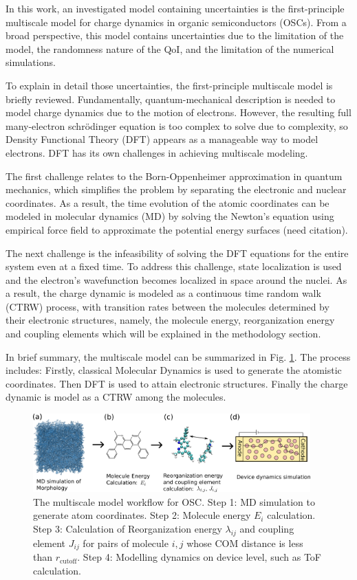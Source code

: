 \documentclass[letterpaper,12pt]{article}
\begin{document}
In this work, an investigated model containing uncertainties is the first-principle multiscale model for charge dynamics in organic semiconductors (OSCs).
From a broad perspective, this model contains uncertainties due to the limitation of the model, the randomness nature of the QoI, and the limitation of the numerical simulations.

To explain in detail those uncertainties, the first-principle multiscale model is briefly reviewed. 
Fundamentally, quantum-mechanical description is needed to model charge dynamics due to the motion of electrons. However, the resulting full many-electron schr\"{o}dinger equation is too complex to solve due to complexity, so Density Functional Theory (DFT) appears as a manageable way to model electrons.
DFT has its own challenges in achieving multiscale modeling.

The first challenge relates to the Born-Oppenheimer approximation in quantum
mechanics, which simplifies the problem by separating the electronic and nuclear
coordinates. As a result, the time evolution of the atomic coordinates can be modeled in molecular dynamics (MD) by solving the Newton's equation using empirical force field to approximate the potential energy surfaces (need citation). 

The next challenge is the infeasibility of solving the DFT equations for the entire system even at a fixed time. To address this challenge, state localization is used and the electron's wavefunction becomes localized in space around the nuclei. As a result, the charge dynamic is modeled as a continuous time random walk (CTRW) process, with transition rates between the molecules determined by their electronic structures, namely, the molecule energy, reorganization energy and coupling elements which will be explained in the methodology section. 

In brief summary, the multiscale model can be summarized in Fig. \ref{fig:MSM}.
The process includes: Firstly, classical Molecular Dynamics is used to generate the atomistic coordinates. Then DFT is used to attain electronic structures. Finally the charge dynamic is model as a CTRW among the molecules.

\begin{figure}[h]
    \centering
    \includegraphics[width=0.95\textwidth]{figs/MSM.png}
    \caption{The multiscale model workflow for OSC. Step 1: MD simulation to generate atom coordinates. Step 2: Molecule energy $E_i$ calculation. Step 3: Calculation of Reorganization energy $\lambda_{ij}$ and coupling element $J_{ij}$ for pairs of molecule $i,j$ whose COM distance is less than $r_\text{cutoff}$. Step 4: Modelling dynamics on device level, such as ToF calculation.}
    \label{fig:MSM}
\end{figure}
\end{document}
